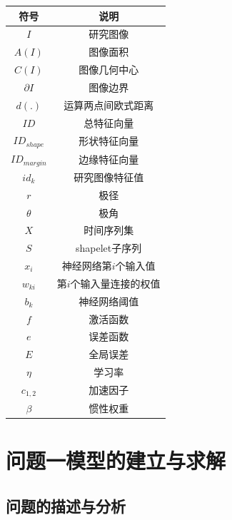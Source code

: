 \documentclass{whutmod}
\begin{document}
	\begin{table}[H]
	\label{biao} \centering
		\begin{tabular}{cc}
			\toprule[1.5pt]
			\multicolumn{1}{m{5cm}}{\centering 符号} & \multicolumn{1}{m{5cm}}{\centering 说明} \\
			\midrule[1pt]
			$I$  &  研究图像 \\ 
			$A(I)$  &  图像面积 \\ 
			$C(I)$  & 图像几何中心\\
			$\partial I$  &  图像边界 \\ 
		    $d(.)$ & 运算两点间欧式距离\\
			$ID$	 &  总特征向量  \\ 
			$ID_{shape}$ &  形状特征向量 \\ 
			$ID_{margin}$	 &  边缘特征向量 \\ 
			$id_{k}$  &   研究图像特征值\\ 
			$r$  &  极径\\	
			$\theta$ & 极角\\
			$X$ &  时间序列集\\ 
			$S$ & shapelet子序列\\
			$x_{i}$ & 神经网络第$i$个输入值\\
			$w_{ki}$ & 第$i$个输入量连接的权值\\
			$b_{k}$ & 神经网络阈值\\
			$f$  & 激活函数\\
			$e$ & 误差函数\\
			$E$ & 全局误差\\
			$\eta $ &  学习率\\
			$c_{1,2}$ & 加速因子\\
			$\beta$ & 惯性权重\\
			

		
			\bottomrule[1.5pt]
		\end{tabular}
	\end{table}

	\section{问题一模型的建立与求解}
	\subsection{问题的描述与分析}
\end{document}
